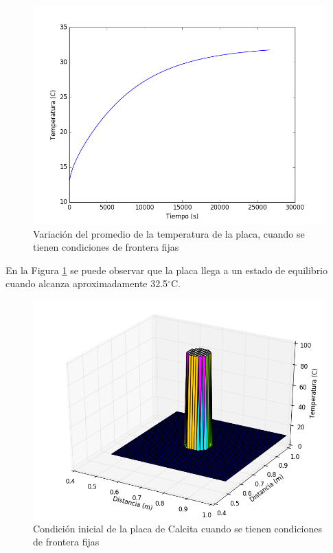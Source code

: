 \documentclass[]{article}
\begin{document}
\begin{figure}[H]
    \centering
    \includegraphics[width=\linewidth]{promediofija.png}
    \caption{Variación del promedio de la temperatura de la placa, cuando se tienen condiciones de frontera fijas}
    \label{fig:promediofija}
\end{figure}

En la Figura \ref{fig:promediofija} se puede observar que la placa llega a un estado de equilibrio cuando alcanza aproximadamente 32.5$^\circ$C.\\

\begin{figure}[H]
    \centering
    \includegraphics[width=\linewidth]{placafijainicial.png}
    \caption{Condición inicial de la placa de Calcita cuando se tienen condiciones de frontera fijas}
    \label{fig:placafijainicial}
\end{figure}
\end{document}
